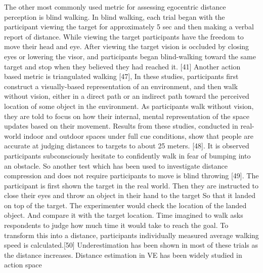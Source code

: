 The other most commonly used metric for assessing egocentric distance perception is blind walking. In blind walking, each trial began with the participant viewing the target for approximately 5 sec and then making a verbal report of distance. While viewing the target participants have the freedom to move their head and eye. After viewing the target vision is occluded by closing eyes or lowering the visor, and participants began blind-walking toward the same target and stop when they believed they had reached it. [41]
Another action based metric is triangulated walking [47], In these studies, participants first construct a visually-based representation of an environment, and then walk without vision, either in a direct path or an indirect path toward the perceived location of some object in the environment. As participants walk without vision, they are told to focus on how their internal, mental representation of the space updates based on their movement. Results from these studies, conducted in real-world indoor and outdoor spaces under full cue conditions, show that people are accurate at judging distances to targets to about 25 meters. [48]. 
It is observed participants subconsciously hesitate to confidently walk in fear of bumping into an obstacle. So another test which has been used to investigate distance compression and does not require participants to move is blind throwing [49]. The participant is first shown the target in the real world. Then they are instructed to close their eyes and throw an object in their hand to the target So that it landed on top of the target. The experimenter would check the location of the landed object. And compare it with the target location.
Time imagined to walk asks respondents to judge how much time it would take to reach the goal. To transform this into a distance, participants individually measured average walking speed is calculated.[50]
Underestimation has been shown in most of these trials as the distance increases. Distance estimation in VE has been widely studied in action space 

